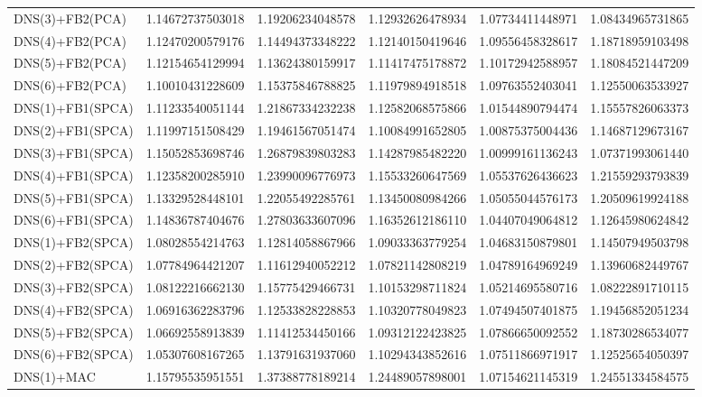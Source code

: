 \begin{table}[h]
\begin{adjustbox}{totalheight=\baselineskip}
\begin{tabular}{lSSSSS}
DNS(3)+FB2(PCA) & 1.14672737503018 & 1.19206234048578 & 1.12932626478934 & 1.07734411448971 & 1.08434965731865 \\ 
DNS(4)+FB2(PCA) & 1.12470200579176 & 1.14494373348222 & 1.12140150419646 & 1.09556458328617 & 1.18718959103498 \\ 
DNS(5)+FB2(PCA) & 1.12154654129994 & 1.13624380159917 & 1.11417475178872 & 1.10172942588957 & 1.18084521447209 \\ 
DNS(6)+FB2(PCA) & 1.10010431228609 & 1.15375846788825 & 1.11979894918518 & 1.09763552403041 & 1.12550063533927 \\ 
DNS(1)+FB1(SPCA) & 1.11233540051144 & 1.21867334232238 & 1.12582068575866 & 1.01544890794474 & 1.15557826063373 \\ 
DNS(2)+FB1(SPCA) & 1.11997151508429 & 1.19461567051474 & 1.10084991652805 & 1.00875375004436 & 1.14687129673167 \\ 
DNS(3)+FB1(SPCA) & 1.15052853698746 & 1.26879839803283 & 1.14287985482220 & 1.00999161136243 & 1.07371993061440 \\ 
DNS(4)+FB1(SPCA) & 1.12358200285910 & 1.23990096776973 & 1.15533260647569 & 1.05537626436623 & 1.21559293793839 \\ 
DNS(5)+FB1(SPCA) & 1.13329528448101 & 1.22055492285761 & 1.13450080984266 & 1.05055044576173 & 1.20509619924188 \\ 
DNS(6)+FB1(SPCA) & 1.14836787404676 & 1.27803633607096 & 1.16352612186110 & 1.04407049064812 & 1.12645980624842 \\ 
DNS(1)+FB2(SPCA) & 1.08028554214763 & 1.12814058867966 & 1.09033363779254 & 1.04683150879801 & 1.14507949503798 \\ 
DNS(2)+FB2(SPCA) & 1.07784964421207 & 1.11612940052212 & 1.07821142808219 & 1.04789164969249 & 1.13960682449767 \\ 
DNS(3)+FB2(SPCA) & 1.08122216662130 & 1.15775429466731 & 1.10153298711824 & 1.05214695580716 & 1.08222891710115 \\ 
DNS(4)+FB2(SPCA) & 1.06916362283796 & 1.12533828228853 & 1.10320778049823 & 1.07494507401875 & 1.19456852051234 \\ 
DNS(5)+FB2(SPCA) & 1.06692558913839 & 1.11412534450166 & 1.09312122423825 & 1.07866650092552 & 1.18730286534077 \\ 
DNS(6)+FB2(SPCA) & 1.05307608167265 & 1.13791631937060 & 1.10294343852616 & 1.07511866971917 & 1.12525654050397 \\ 
DNS(1)+MAC & 1.15795535951551 & 1.37388778189214 & 1.24489057898001 & 1.07154621145319 & 1.24551334584575 \\ 

\end{tabular}
\end{adjustbox}
\end{table}
